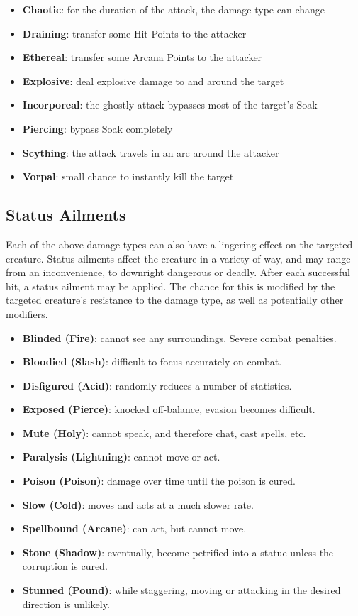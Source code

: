 \begin{itemize}
\item {\bf Chaotic}: for the duration of the attack, the damage type can change
\item {\bf Draining}: transfer some Hit Points to the attacker
\item {\bf Ethereal}: transfer some Arcana Points to the attacker
\item {\bf Explosive}: deal explosive damage to and around the target
\item {\bf Incorporeal}: the ghostly attack bypasses most of the target's Soak
\item {\bf Piercing}: bypass Soak completely
\item {\bf Scything}: the attack travels in an arc around the attacker
\item {\bf Vorpal}: small chance to instantly kill the target
\end{itemize}

\subsection{Status Ailments}

Each of the above damage types can also have a lingering effect on the
targeted creature.  Status ailments affect the creature in a variety of
way, and may range from an inconvenience, to downright dangerous or
deadly.  After each successful hit, a status ailment may be applied.  The
chance for this is modified by the targeted creature's resistance to the
damage type, as well as potentially other modifiers.

\begin{itemize}
\item {\bf Blinded (Fire)}: cannot see any surroundings.  Severe combat 
penalties.
\item {\bf Bloodied (Slash)}: difficult to focus accurately on combat.  
\item {\bf Disfigured (Acid)}: randomly reduces a number of statistics.
\item {\bf Exposed (Pierce)}: knocked off-balance, evasion becomes 
difficult.  
\item {\bf Mute (Holy)}: cannot speak, and therefore chat, cast spells, 
etc.
\item {\bf Paralysis (Lightning)}: cannot move or act.
\item {\bf Poison (Poison)}: damage over time until the poison is cured.
\item {\bf Slow (Cold)}: moves and acts at a much slower rate.
\item {\bf Spellbound (Arcane)}: can act, but cannot move.
\item {\bf Stone (Shadow)}: eventually, become petrified into a statue 
unless the corruption is cured.
\item {\bf Stunned (Pound)}: while staggering, moving or attacking in the 
desired direction is unlikely.
\end{itemize}

